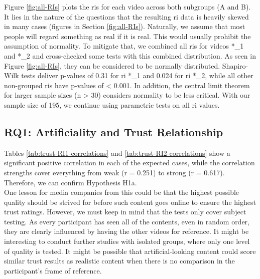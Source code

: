 \documentclass[
  a4paper,  %
  twoside,  %
  bibliography=totoc,
  headsepline,
  cleardoublepage=empty,
  parskip=half,
  draft=false
]{scrbook}
\begin{document}
Figure \ref{fig:all-RIs} plots the \gls{ri}s for each video across both subgroups (A and B). \\
It lies in the nature of the questions that the resulting \gls{ri} data is heavily skewed in many cases (figures in Section \ref{fig:all-RIs}). Naturally, we assume that most people will regard something as real if it is real. This would usually prohibit the assumption of normality. To mitigate that, we combined all \gls{ri}s for videos *\_1 and *\_2 and cross-checked some tests with this combined distribution. As seen in Figure \ref{fig:all-RIs}, they can be considered to be normally distributed. Shapiro-Wilk tests deliver p-values of 0.31 for \gls{ri} *\_1 and 0.024 for \gls{ri} *\_2, while all other non-grouped \gls{ri}s have p-values of < 0.001. In addition, the central limit theorem for larger sample sizes (n > 30) considers normality to be less critical. With our sample size of 195, we continue using parametric tests on all \gls{ri} values.

\subsection{RQ1: Artificiality and Trust Relationship}
\label{subsec:RQ1}

Tables \ref{tab:trust-RI1-correlations} and \ref{tab:trust-RI2-correlations} show a significant positive correlation in each of the expected cases, while the correlation strengths cover everything from weak (r = 0.251) to strong (r = 0.617). Therefore, we can confirm Hypothesis H1a. \\
One lesson for media companies from this could be that the highest possible quality should be strived for before such content goes online to ensure the highest trust ratings. However, we must keep in mind that the tests only cover subject testing. As every participant has seen all of the contents, even in random order, they are clearly influenced by having the other videos for reference. It might be interesting to conduct further studies with isolated groups, where only one level of quality is tested. It might be possible that artificial-looking content could score similar trust results as realistic content when there is no comparison in the participant's frame of reference.
\end{document}
